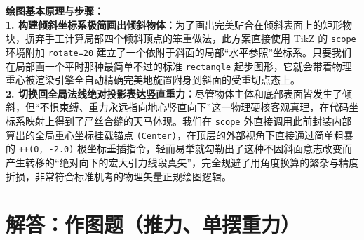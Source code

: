 \vspace{0.6cm}

{\small\color{blue!70!black}
\textbf{绘图基本原理与步骤：}\\
\textbf{1. 构建倾斜坐标系极简画出倾斜物体：}为了画出完美贴合在倾斜表面上的矩形物块，摒弃手工计算局部四个倾斜顶点的笨重做法，此方案直接使用 TikZ 的 \texttt{scope} 环境附加 \texttt{rotate=20} 建立了一个依附于斜面的局部“水平参照”坐标系。只要我们在局部画一个平时那种最简单不过的标准 \texttt{rectangle} 起步图形，它就会带着物理重心被渲染引擎全自动精确完美地旋置附身到斜面的受重切点态上。\\
\textbf{2. 切换回全局法线绝对投影表达竖直重力：}尽管物体主体和底部表面皆发生了倾斜，但“不惧束缚、重力永远指向地心竖直向下”这一物理硬核客观真理，在代码坐标系映射上得到了严丝合缝的天马体现。我们在 \texttt{scope} 外直接调用此前封装内部算出的全局重心坐标挂载锚点 \texttt{(Center)}，在顶层的外部视角下直接通过简单粗暴的 \texttt{++(0, -2.0)} 极坐标垂插指令，轻而易举就勾勒出了这种不因斜面意志改变而产生转移的“绝对向下的宏大引力线段真矢”，完全规避了用角度换算的繁杂与精度折损，非常符合标准机考的物理矢量正规绘图逻辑。
}



\section{解答：作图题（推力、单摆重力）}

\vspace{0.6cm}

